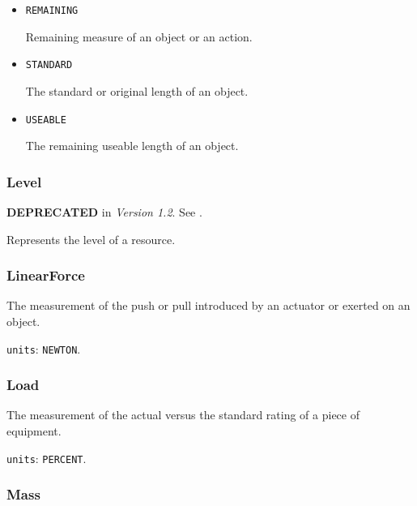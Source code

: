 \begin{itemize}

\item \texttt{REMAINING}


Remaining measure of an object or an action.

\item \texttt{STANDARD}


The standard or original length of an object.

\item \texttt{USEABLE}


The remaining useable length of an object.


\end{itemize}






\subsubsection{Level}
\label{sec:Level}



\textbf{DEPRECATED} in \textit{Version 1.2}.  See .

Represents the level of a resource.



\subsubsection{LinearForce}
\label{sec:LinearForce}



The measurement of the push or pull introduced by an actuator or exerted on an object.


\texttt{units}: \texttt{NEWTON}.


\subsubsection{Load}
\label{sec:Load}



The measurement of the actual versus the standard rating of a piece of equipment.


\texttt{units}: \texttt{PERCENT}.


\subsubsection{Mass}
\label{sec:Mass}



